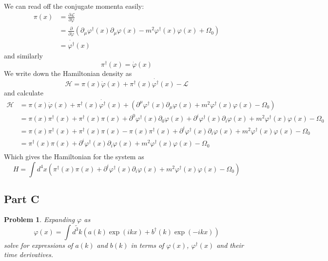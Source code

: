 \documentclass[fontsize=11pt]{scrartcl} %
\numberwithin{equation}{section} %
\numberwithin{figure}{section} %
\numberwithin{table}{section} %
\newtheorem*{problem}{Problem}
\begin{document}
We can read off the conjugate momenta easily:
\[
    \begin{aligned}
        \pi(x) &= \frac{\partial\mathscr{L}}{\partial\dot{\varphi}}\\
        &=
        \frac{\partial}{\partial\dot{\varphi}}
        (\partial_{\mu}\varphi^{\dagger}(x)\partial_{\mu}\varphi(x) -
        m^2\varphi^{\dagger}(x)\varphi(x) + \Omega_0)\\
        &= \dot{\varphi^{\dagger}}(x)
    \end{aligned}
\]
and similarly
\[
    \pi^{\dagger}(x) = \dot{\varphi}(x)
\]
We write down the Hamiltonian density as
\[
    \mathscr{H} = \pi(x)\dot{\varphi}(x) +
    \pi^{\dagger}(x)\dot{\varphi^{\dagger}}(x) - \mathscr{L}
\]
and calculate
\[
    \begin{aligned}
        \mathscr{H} &= \pi(x)\dot{\varphi}(x)
        + \pi^{\dagger}(x)\dot{\varphi^{\dagger}}(x) 
        + \left( \partial^{\mu}\varphi^{\dagger}(x)\partial_{\mu}\varphi(x)
        + m^2 \varphi^{\dagger}(x)\varphi(x) - \Omega_0\right)\\
        &=\pi(x)\pi^{\dagger}(x) + \pi^{\dagger}(x)\pi(x)
        +\partial^{0}\varphi^{\dagger}(x)\partial_{0}\varphi(x)
        +\partial^{i}\varphi^{\dagger}(x)\partial_{i}\varphi(x)
        +m^2\varphi^{\dagger}(x)\varphi(x) - \Omega_0\\
        &=\pi(x)\pi^{\dagger}(x) + \pi^{\dagger}(x)\pi(x)
        -\pi(x)\pi^{\dagger}(x)
        +\partial^{i}\varphi^{\dagger}(x)\partial_{i}\varphi(x)
        +m^2\varphi^{\dagger}(x)\varphi(x) - \Omega_0\\
        &=\pi^{\dagger}(x)\pi(x)
        +\partial^{i}\varphi^{\dagger}(x)\partial_{i}\varphi(x)
        +m^2\varphi^{\dagger}(x)\varphi(x) - \Omega_0\\
    \end{aligned}
\]
Which gives the Hamiltonian for the system as
\[
    H = \int d^4x \left( \pi^{\dagger}(x)\pi(x)
        +\partial^{i}\varphi^{\dagger}(x)\partial_{i}\varphi(x)
        +m^2\varphi^{\dagger}(x)\varphi(x) - \Omega_0 \right)
\]

\subsection*{Part C}
\begin{problem}
    Expanding $\varphi$ as
    \[
        \varphi(x) = \int \tilde{d^3k}\left( a(k)\exp(ikx) +
        b^{\dagger}(k)\exp(-ikx) \right)
    \]
    solve for expressions of $a(k)$ and $b(k)$ in terms of $\varphi(x)$,
    $\varphi^{\dagger}(x)$ and their time derivatives.
\end{problem}
\end{document}
